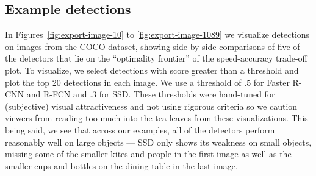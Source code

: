 \documentclass[10pt,twocolumn,letterpaper]{article}
\begin{document}
\subsection{Example detections}
\label{sec:exampls}

In Figures~\ref{fig:export-image-10} to \ref{fig:export-image-1089}
we visualize detections on images from the COCO dataset, showing side-by-side comparisons of five
of the detectors that lie on the ``optimality frontier'' of the speed-accuracy
trade-off plot.  To visualize, we select detections with score greater
than a  threshold and plot the top 20 detections in each image.  We
use a threshold of .5 for Faster R-CNN and R-FCN and .3 for SSD.
These thresholds were hand-tuned for (subjective) visual
attractiveness and not using  rigorous criteria so we caution viewers
from reading too much into the tea leaves from these visualizations.
This being said, we see that across our examples, all of the detectors
perform reasonably well on large objects --- SSD only shows its
weakness on small objects, missing some of the smaller kites and
people in the first image as well as the smaller cups and bottles on
the dining table in the last image.  

\newcommand{\figdir}{Figures/cocovis}

\newcommand{\addfig}[2] {
    \begin{figure*}
      \centering
        \begin{subfigure}[t]{0.4\textwidth}
        \centering\texttt{[image: \\figdir/ssd\_mobilenet/\#1.jpg]}
      \caption{SSD+Mobilenet, lowres}
        \end{subfigure}
        \begin{subfigure}[t]{0.4\textwidth}
        \centering\texttt{[image: \\figdir/ssd\_inceptionv2/\#1.jpg]}
      \caption{SSD+InceptionV2, lowres}
        \end{subfigure}
        \begin{subfigure}[t]{0.4\textwidth}
        \centering\texttt{[image: \\figdir/fasterrcnn\_resnet101\_100/\#1.jpg]}
      \caption{FRCNN+Resnet101, 100 proposals}
        \end{subfigure}
        \begin{subfigure}[t]{0.4\textwidth}
        \centering\texttt{[image: \\figdir/rfcn\_resnet101\_300/\#1.jpg]}
      \caption{RFCN+Resnet10, 300 proposals}
        \end{subfigure}
        \begin{subfigure}[t]{0.4\textwidth}
        \centering\texttt{[image: \\figdir/fasterrcnn\_inceptionresnetv2\_300/\#1.jpg]}
      \caption{FRCNN+IncResnetV2, 300 proposals}
        \end{subfigure}
        \caption{Example detections from 5 different models.}
        \label{fig:#1}
    \end{figure*}
}
\end{document}
